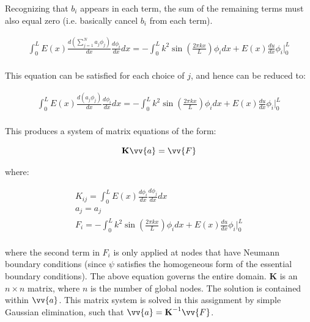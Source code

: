 \documentclass[10pt]{article}
\begin{document}
Recognizing that \(b_i\) appears in each term, the sum of the remaining terms must also equal zero (i.e. basically cancel \(b_i\) from each term).

\begin{equation}
\begin{aligned}
\int_{0}^{L}E(x)\frac{d\left(\sum_{j=1}^{N}a_j\phi_j\right)}{dx}\frac{d\phi_i}{dx}dx=-\int_{0}^{L}k^2\sin{\left(\frac{2\pi kx}{L}\right)}\phi_idx+E(x)\frac{du}{dx}\phi_i\biggr\vert_{0}^{L}\\
\end{aligned}
\end{equation}

This equation can be satisfied for each choice of \(j\), and hence can be reduced to:

\begin{equation}
\begin{aligned}
\int_{0}^{L}E(x)\frac{d\left(a_j\phi_j\right)}{dx}\frac{d\phi_i}{dx}dx=-\int_{0}^{L}k^2\sin{\left(\frac{2\pi kx}{L}\right)}\phi_idx+E(x)\frac{du}{dx}\phi_i\biggr\vert_{0}^{L}\\
\end{aligned}
\end{equation}

This produces a system of matrix equations of the form:

\begin{equation}
\label{eq:MatrixEqn}
\textbf{K}\vv{a}=\vv{F}
\end{equation}

where:

\begin{equation}
\begin{aligned}
\label{eq:SystemEquations}
K_{ij}=\int_{0}^{L}E(x)\frac{d\phi_i}{dx}\frac{d\phi_j}{dx}dx\\
a_j=a_j\\
F_i=-\int_{0}^{L}k^2\sin{\left(\frac{2\pi kx}{L}\right)}\phi_idx+E(x)\frac{du}{dx}\phi_i\biggr\vert_{0}^{L}\\
\end{aligned}
\end{equation}

where the second term in \(F_i\) is only applied at nodes that have Neumann boundary conditions (since \(\psi\) satisfies the homogeneous form of the essential boundary conditions). The above equation governs the entire domain. \(\textbf{K}\) is an \(n \times n\) matrix, where \(n\) is the number of global nodes. The solution is contained within \(\vv{a}\). This matrix system is solved in this assignment by simple Gaussian elimination, such that \(\vv{a}=\textbf{K}^{-1}\vv{F}\).
\end{document}
